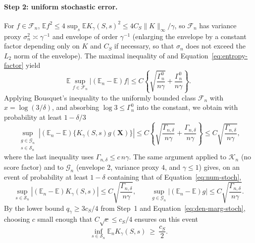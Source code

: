 \paragraph{Step 2: uniform stochastic error.}
For $f\in\mathcal{F}_n$, $\mathbb{E}f^2\le4\sup_{s}\mathbb{E}K_{\gamma}(S,s)^2\le4C_S\lVert K\rVert_\infty/\gamma$, so $\mathcal{F}_n$ has variance proxy $\sigma_n^2\asymp\gamma^{-1}$ and envelope of order $\gamma^{-1}$ (enlarging the envelope by a constant factor depending only on $K$ and $C_S$ if necessary, so that $\sigma_n$ does not exceed the $L_2$ norm of the envelope).  The maximal inequality of \citet[Corollary~5.1]{chernozhukov2014gaussian} and Equation~\ref{eq:entropy-factor} yield
\[
  \mathbb{E}\sup_{f\in\mathcal{F}_n}|(\mathbb{E}_n-\mathbb{E})f|
  \le C\left\{\sqrt{\frac{\Gamma_n^0}{n\gamma}}+\frac{\Gamma_n^0}{n\gamma}\right\}.
\]
Applying Bousquet's inequality \citep[Theorem~2.3]{bousquet2002bennett} to the uniformly bounded class $\mathcal{F}_n$ with $x=\log(3/\delta)$, and absorbing $\log3\le\Gamma_n^0$ into the constant, we obtain with probability at least $1-\delta/3$
\begin{equation}
  \sup_{\substack{g\in\mathcal{G}_n\\ s\in\mathcal{S}_n}}
  \left|(\mathbb{E}_n-\mathbb{E})\{K_{\gamma}(S,s)g(\mathbf{X})\}\right|
  \le C\left\{\sqrt{\frac{\Gamma_{n,\delta}}{n\gamma}}+\frac{\Gamma_{n,\delta}}{n\gamma}\right\}
  \le C\sqrt{\frac{\Gamma_{n,\delta}}{n\gamma}},
  \label{eq:num-stoch}
\end{equation}
where the last inequality uses $\Gamma_{n,\delta}\le c\,n\gamma$.  The same argument applied to $\mathcal{K}_n$ (no score factor) and to $\mathcal{G}_n$ (envelope $2$, variance proxy $4$, and $\gamma\le1$) gives, on an event of probability at least $1-\delta$ containing that of Equation~\ref{eq:num-stoch},
\begin{equation}
  \sup_{s\in\mathcal{S}_n}|(\mathbb{E}_n-\mathbb{E})K_{\gamma}(S,s)|
  \le C\sqrt{\frac{\Gamma_{n,\delta}}{n\gamma}},
  \qquad
  \sup_{g\in\mathcal{G}_n}|(\mathbb{E}_n-\mathbb{E})g|
  \le C\sqrt{\frac{\Gamma_{n,\delta}}{n\gamma}} .
  \label{eq:den-marg-stoch}
\end{equation}
By the lower bound $q_\gamma\ge3c_S/4$ from Step~1 and Equation~\ref{eq:den-marg-stoch}, choosing $c$ small enough that $C\sqrt{c}\le c_S/4$ ensures on this event
\begin{equation}
  \inf_{s\in\mathcal{S}_n}\mathbb{E}_nK_{\gamma}(S,s)\ \ge\ \frac{c_S}{2} .
  \label{eq:den-lower}
\end{equation}
